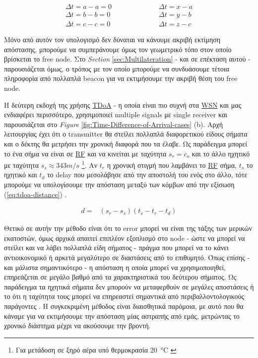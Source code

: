 \begin{align}
	\Delta t = a-a = 0 \quad \quad \quad & \quad \quad \quad\Delta t = x-a \nonumber \\
	\Delta t = b-b = 0 \quad \quad \quad & \quad \quad \quad\Delta t = y-b \nonumber \\
	\Delta t = c-c = 0 \quad \quad \quad & \quad \quad \quad\Delta t = z-c \nonumber
\end{align}

Μόνο από αυτόν τον υπολογισμό δεν δύναται να κάνουμε ακριβή εκτίμηση από\-στασης, 
μπορούμε να συμπεράνουμε όμως τον γεωμετρικό τόπο στον οποίο βρίσκεται το free node. Στο \emph{Section} \ref{sec:Multilateration} - και σε επέκταση αυτού -
παρουσιάζεται όμως, ο τρόπος με τον οποίο μπορούμε να συνδυάσουμε τέτοια πληροφορία από πολλαπλά beacon για να εκτιμήσουμε την ακριβή θέση του free node.

Η δεύτερη εκδοχή της χρήσης \hyperref[abbr:TDoA]{TDoA} - η οποία είναι πιο συχνή στα \hyperref[abbr:WSN]{WSN} και 
μας ε\-νδια\-φέ\-ρει περισσότερο, 
χρησιμοποιεί multiple signals με single receiver και παρουσιάζεται στο \emph{Figure} \ref{fig:Time-Difference-of-Arrival-cases} (b). 
Αρχή λειτουργίας έχει ότι ο transmitter θα στείλει πολλαπλά διαφορετικού είδους σήματα και ο δέκτης θα μετρήσει την χρονική διαφορά 
που τα έλαβε. Ως παράδειγμα μπορεί το ένα σήμα να είναι σε \hyperref[abbr:RF]{RF} και να κινείται με ταχύτητα $s_r=c_o$ και το άλλο 
ηχητικό με ταχύτητα $s_s \approx 343m/s$ \footnote{Για μετάδοση σε ξηρό αέρα υπό θερμοκρασία \SI{20}{\celsius} \cite{wikipedia-speed-of-sound}}. 
Αν $t_r$ η χρονική στιγμή που λαμβάνει το \hyperref[abbr:RF]{RF} σήμα, $t_s$ το ηχητικό και $t_d$ το delay που μεσολάβησε από την αποστολή του ενός στο άλλο,
τότε μπορούμε να υπολογίσουμε την απόσταση μεταξύ των κόμβων από την εξίσωση (\ref{eq:tdoa-distance})
\cite{wsn-Localization-systems} \cite{localization-algorithms}.

\begin{align}
	d=&(s_r-s_s)(t_s-t_r-t_{d}) \label{eq:tdoa-distance}
\end{align}

Θετικό σε αυτήν την μέθοδο είναι ότι το error μπορεί να είναι της τάξης των μερικών εκατοστών, όμως αρχικά απαιτεί επιπλέον εξοπλισμό στο node -
ώστε να μπορεί να στείλει και να λάβει πολλαπλά είδη σήματος - πράγμα που μπορεί να το κάνει αντι\-οι\-κο\-νο\-μι\-κό ή αρκετά μεγαλύτερο σε διαστάσεις από 
το επιθυμητό. Όπως επίσης - και μάλιστα  
σημαντικότερο - η απόσταση η οποία μπορεί να 
χρησιμοποιηθεί, επηρεάζεται σε μεγάλο βαθμό από τα χαρακτηριστικά του δεύτερου σήματος. Ως παράδειγμα τα ηχητικά σήματα 
δεν μπορούν να μεταφερθούν σε μεγάλες αποστάσεις ή το ότι η ταχύτητα τους μπορεί να επηρεαστεί σημαντικά από περιβαλλοντολογικούς παράγοντες
\cite{farooqiazam2016location}. Η συγκεκριμένη μέθοδος είναι διαισθητικά παρόμοια, με αυτό που θα κάναμε για να εκτιμήσουμε 
την απόσταση μίας αστραπής από εμάς, μετρώντας το χρονικό διάστημα μέχρι να ακούσουμε την βροντή. 

